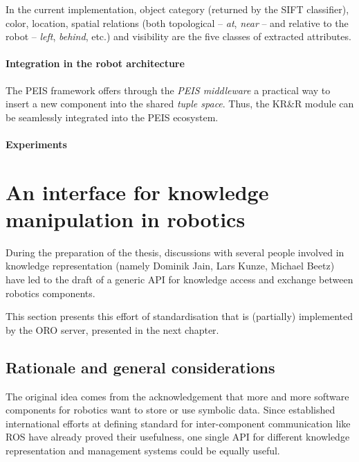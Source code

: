 In the current implementation, object category (returned by the SIFT
classifier), color, location, spatial relations (both topological -- \emph{at},
\emph{near} -- and relative to the robot -- \emph{left}, \emph{behind}, etc.)
and visibility are the five classes of extracted attributes.

\paragraph{Integration in the robot architecture}
\label{sect|peis-integration}

The PEIS framework offers through the \emph{PEIS middleware} a practical way to
insert a new component into the shared \emph{tuple space}.  Thus, the KR\&R
module can be seamlessly integrated into the PEIS ecosystem.

\paragraph{Experiments}
\label{sect|peis-expe}




\section{An interface for knowledge manipulation in robotics}
\label{sect|knowledge-api}

During the preparation of the thesis, discussions with several people involved
in knowledge representation (namely Dominik Jain, Lars Kunze, Michael Beetz)
have led to the draft of a generic API for knowledge access and exchange
between robotics components.

This section presents this effort of standardisation that is (partially)
implemented by the ORO server, presented in the next chapter.

\subsection{Rationale and general considerations}

The original idea comes from the acknowledgement that more and more software
components for robotics want to store or use symbolic data. Since established
international efforts at defining standard for inter-component communication
like ROS have already proved their usefulness, one single API for different
knowledge representation and management systems could be equally useful.

